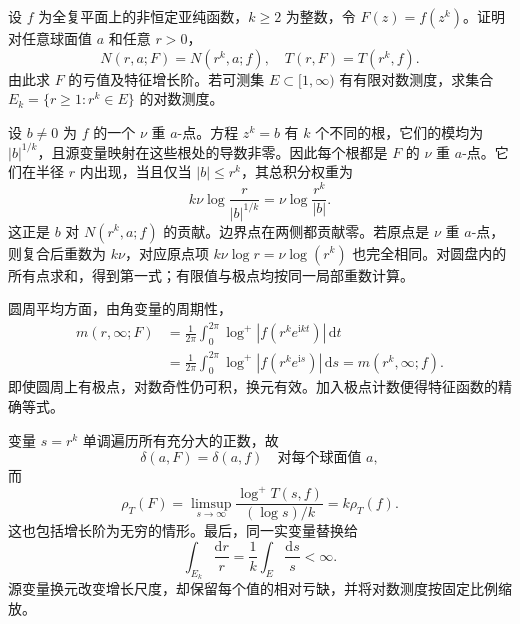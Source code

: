 \begin{optionalexercise}\label{b3:ex:C-7}
设 \(f\) 为全复平面上的非恒定亚纯函数，\(k\ge2\) 为整数，令 \(F(z)=f(z^k)\)。证明对任意球面值 \(a\) 和任意 \(r>0\)，
\[
 N(r,a;F)=N(r^k,a;f),
 \quad T(r,F)=T(r^k,f).
\]
由此求 \(F\) 的亏值及特征增长阶。若可测集 \(E\subset[1,\infty)\) 有有限对数测度，求集合 \(E_k=\{r\ge1:r^k\in E\}\) 的对数测度。
\end{optionalexercise}
\begin{solution}
设 \(b\ne0\) 为 \(f\) 的一个 \(\nu\) 重 \(a\)-点。方程 \(z^k=b\) 有 \(k\) 个不同的根，它们的模均为 \(|b|^{1/k}\)，且源变量映射在这些根处的导数非零。因此每个根都是 \(F\) 的 \(\nu\) 重 \(a\)-点。它们在半径 \(r\) 内出现，当且仅当 \(|b|\le r^k\)，其总积分权重为
\[
 k\nu\log\frac r{|b|^{1/k}}
 =\nu\log\frac{r^k}{|b|}.
\]
这正是 \(b\) 对 \(N(r^k,a;f)\) 的贡献。边界点在两侧都贡献零。若原点是 \(\nu\) 重 \(a\)-点，则复合后重数为 \(k\nu\)，对应原点项
\(k\nu\log r=\nu\log(r^k)\)
也完全相同。对圆盘内的所有点求和，得到第一式；有限值与极点均按同一局部重数计算。

圆周平均方面，由角变量的周期性，
\[
 \begin{aligned}
 m(r,\infty;F)
 &=\frac1{2\pi}\int_0^{2\pi}
       \log^+|f(r^ke^{\mathrm{i}kt})|\,\mathrm{d}t\\
 &=\frac1{2\pi}\int_0^{2\pi}
       \log^+|f(r^ke^{\mathrm{i}s})|\,\mathrm{d}s
 =m(r^k,\infty;f).
 \end{aligned}
\]
即使圆周上有极点，对数奇性仍可积，换元有效。加入极点计数便得特征函数的精确等式。

变量 \(s=r^k\) 单调遍历所有充分大的正数，故
\[
 \delta(a,F)=\delta(a,f)
 \quad\text{对每个球面值 }a,
\]
而
\[
 \rho_T(F)
 =\limsup_{s\to\infty}\frac{\log^+T(s,f)}{(\log s)/k}
 =k\rho_T(f).
\]
这也包括增长阶为无穷的情形。最后，同一实变量替换给
\[
 \int_{E_k}\frac{\mathrm{d}r}{r}
 =\frac1k\int_E\frac{\mathrm{d}s}{s}<\infty.
\]
源变量换元改变增长尺度，却保留每个值的相对亏缺，并将对数测度按固定比例缩放。
\end{solution}

